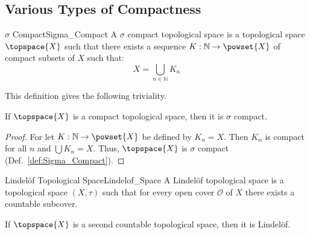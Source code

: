     \subsection{Various Types of Compactness}
        \begin{fdefinition}{$\sigma$ Compact}{Sigma_Compact}
            A $\sigma$ compact topological space is a topological space
            $\topspace{X}$ such that there exists a sequence
            $K:\mathbb{N}\rightarrow\powset{X}$ of compact subsets of $X$ such
            that:
            \begin{equation*}
                X=\bigcup_{n\in\mathbb{N}}K_{n}
            \end{equation*}
        \end{fdefinition}
        This definition gives the following triviality.
        \begin{theorem}
            \label{thm:Compact_Implies_Sigma_Compact}%
            If $\topspace{X}$ is a compact topological space, then it is
            $\sigma$ compact.
        \end{theorem}
        \begin{proof}
            For let $K:\mathbb{N}\rightarrow\powset{X}$ be defined by
            $K_{n}=X$. Then $K_{n}$ is compact for all $n$ and
            $\bigcup{K}_{n}=X$. Thus, $\topspace{X}$ is $\sigma$ compact
            (Def.~\ref{def:Sigma_Compact}).
        \end{proof}
        \begin{fdefinition}{Lindel\"{o}f Topological Space}{Lindelof_Space}
            A Lindel\"{o}f topological space is a topological space $(X,\tau)$
            such that for every open cover $\mathcal{O}$ of $X$ there exists a
            countable subcover.
        \end{fdefinition}
        \begin{theorem}
            \label{thm:Second_Countable_Implies_Lindelof}%
            If $\topspace{X}$ is a second countable topological space, then it
            is Lindel\"{o}f.
        \end{theorem}
